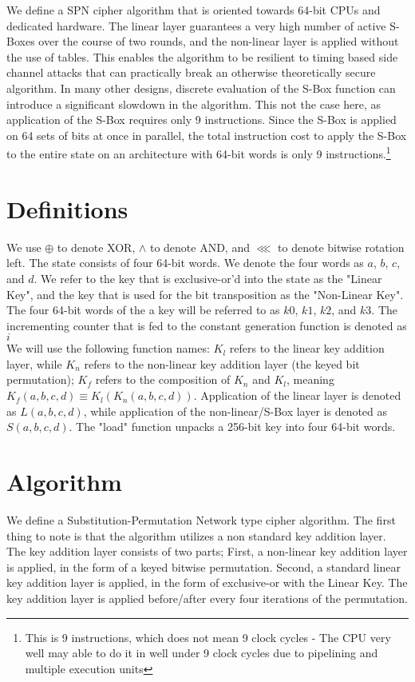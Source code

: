\documentclass[preprint]{iacrtrans}
\begin{document}
We define a SPN cipher algorithm that is oriented towards 64-bit CPUs and dedicated hardware. The linear layer guarantees a very high number of active S-Boxes over the course of two rounds, and the non-linear layer is applied without the use of tables. This enables the algorithm to be resilient to timing based side channel attacks that can practically break an otherwise theoretically secure algorithm. In many other designs, discrete evaluation of the S-Box function can introduce a significant slowdown in the algorithm. This not the case here, as application of the S-Box requires only 9 instructions. Since the S-Box is applied on 64 sets of bits at once in parallel, the total instruction cost to apply the S-Box to the entire state on an architecture with 64-bit words is only 9 instructions.\footnote{This is 9 instructions, which does not mean 9 clock cycles - The CPU very well may able to do it in well under 9 clock cycles due to pipelining and multiple execution units}


\section{Definitions}
We use $\oplus$ to denote XOR, $\land$ to denote AND, and $\lll$ to denote bitwise rotation left. The state consists of four 64-bit words. We denote the four words as $a$, $b$, $c$, and $d$. We refer to the key that is exclusive-or'd into the state as the "Linear Key", and the key that is used for the bit transposition as the "Non-Linear Key". The four 64-bit words of the a key will be referred to as $k0$, $k1$, $k2$, and $k3$. The incrementing counter that is fed to the constant generation function is denoted as $i$\\

We will use the following function names: $K_l$ refers to the linear key addition layer, while $K_n$ refers to the non-linear key addition layer (the keyed bit permutation); $K_f$ refers to the composition of $K_n$ and $K_l$, meaning $K_f(a, b, c, d) \equiv K_l(K_n(a, b, c, d))$. Application of the linear layer is denoted as $L(a, b, c, d)$, while application of the non-linear/S-Box layer is denoted as $S(a, b, c, d)$. The "load" function unpacks a 256-bit key into four 64-bit words.

\section{Algorithm}
 We define a Substitution-Permutation Network type cipher algorithm. The first thing to note is that the algorithm utilizes a non standard key addition layer. The key addition layer consists of two parts; First, a non-linear key addition layer is applied, in the form of a keyed bitwise permutation. Second, a standard linear key addition layer is applied, in the form of exclusive-or with the Linear Key. The key addition layer is applied before/after every four iterations of the permutation.
\end{document}
